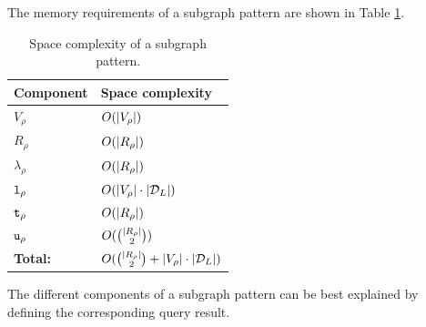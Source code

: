 The memory requirements of a subgraph pattern are shown in Table
\ref{table:subgraph-pattern-mem-reqs}.

\begin{table}
\centering
\begin{tabular}{ll}
\toprule
Component       & Space complexity                                                    \\ \midrule
$V_\rho$        & $O({\left \vert V_\rho \right \vert})$                                                  \\[3pt]
$R_\rho$        & $O({\left \vert R_\rho \right \vert})$                                                  \\[3pt]
$\lambda_\rho$  & $O({\left \vert R_\rho \right \vert})$                                                  \\[3pt]
$\texttt{l}_\rho$  & $O({\left \vert V_\rho \right \vert} \cdot {\left \vert \mathcal{D}_L\right \vert})$                            \\[3pt]
$\texttt{t}_\rho$   & $O({\left \vert R_\rho \right \vert})$                                                  \\[3pt]
$\texttt{u}_\rho$  & $O(\binom{{\left \vert R_\rho \right \vert}}{2})$                                       \\[3pt]
\textbf{Total:} & $O(\binom{{\left \vert R_\rho \right \vert}}{2} + {\left \vert V_\rho \right \vert} \cdot {\left \vert \mathcal{D}_L\right \vert})$ \\
\bottomrule
\end{tabular}
\caption{Space complexity of a subgraph pattern.}
\label{table:subgraph-pattern-mem-reqs}
\end{table}

The different components of a subgraph pattern can be best explained by
defining the corresponding query result.

